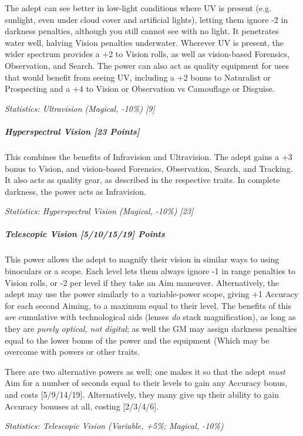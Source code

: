 \begin{multicols*}{3}
		The adept can see better in low-light conditions where UV is present (e.g. sunlight, even under cloud cover and artificial lights), letting them ignore -2 in darkness penalties, although you still cannot see with no light. It penetrates water well, halving Vision penalties underwater. Wherever UV is present, the wider spectrum provides a +2 to Vision rolls, as well as vision-based Forensics, Observation, and Search. The power can also act as quality equipment for uses that would benefit from seeing UV, including a +2 bonus to Naturalist or Prospecting and a +4 to Vision or Observation vs Camouflage or Disguise.
	
		\textcolor{OliveGreen}{\textit{Statistics: Ultravision (Magical, -10\%) [9] }}
			
	\subparagraph{Hyperspectral Vision [23 Points]}
	
		This combines the benefits of Infravision and Ultravision. The adept gains a +3 bonus to Vision, and vision-based Forensics, Observation, Search, and Tracking. It also acts as quality gear, as described in the respective traits. In complete darkness, the power acts as Infravision.
	
		\textcolor{OliveGreen}{\textit{Statistics: Hyperspectral Vision (Magical, -10\%) [23] }}
	
	\subparagraph{Telescopic Vision [5/10/15/19] Points}
	
		This power allows the adept to magnify their vision in similar ways to using binoculars or a scope. Each level lets them always ignore -1 in range penalties to Vision rolls, or -2 per level if they take an Aim maneuver. Alternatively, the adept may use the power similarly to a variable-power scope, giving +1 Accuracy for each second Aiming, to a maximum equal to their level. The benefits of this \textit{are} cumulative with technological aids (lenses \textit{do} stack magnification), as long as they are \textit{purely optical, not digital}; as well the GM may assign darkness penalties equal to the lower bonus of the power and the equipment (Which may be overcome with powers or other traits.
		
		There are two alternative powers as well; one makes it so that the adept \textit{must} Aim for a number of seconds equal to their levels to gain any Accuracy bonus, and costs [5/9/14/19]. Alternatively, they many give up their ability to gain Accuracy bonuses at all, costing [2/3/4/6].
	
		\textcolor{OliveGreen}{\textit{Statistics: Telescopic Vision (Variable, +5\%; Magical, -10\%) }}
	

\end{multicols*}
